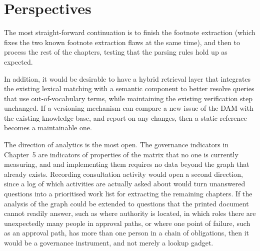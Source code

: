 \section*{Perspectives}

The most straight-forward continuation is to finish the footnote extraction (which fixes the two known footnote extraction flaws at the same time), and then to process the rest of the chapters, testing that the parsing rules hold up as expected.

In addition, it would be desirable to have a hybrid retrieval layer that integrates the existing lexical matching with a semantic component to better resolve queries that use out-of-vocabulary terms, while maintaining the existing verification step unchanged. If a versioning mechanism can compare a new issue of the DAM with the existing knowledge base, and report on any changes, then a static reference becomes a maintainable one.

The direction of analytics is the most open. The governance indicators in Chapter~5 are indicators of properties of the matrix that no one is currently measuring, and and implementing them requires no data beyond the graph that already exists. Recording consultation activity would open a second direction, since a log of which activities are actually asked about would turn unanswered questions into a prioritised work list for extracting the remaining chapters. If the analysis of the graph could be extended to questions that the printed document cannot readily answer, such as where authority is located, in which roles there are unexpectedly many people in approval paths, or where one point of failure, such as an approval path, has more than one person in a chain of obligations, then it would be a governance instrument, and not merely a lookup gadget.